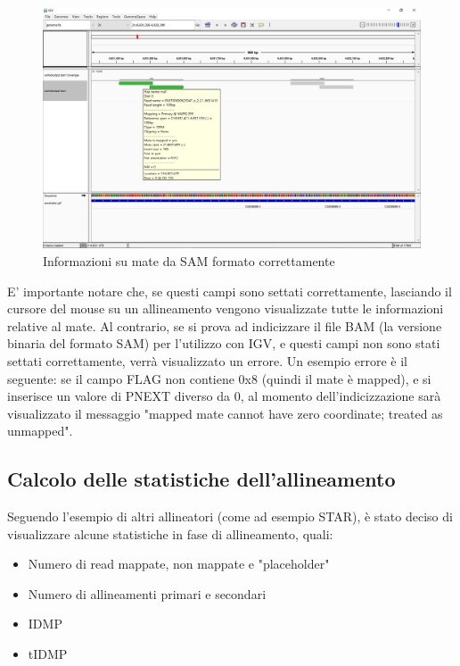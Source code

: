 \begin{figure}[h]
	\centering
	\includegraphics[width=\linewidth]{images/mateinfo.png}
  \caption{Informazioni su mate da SAM formato correttamente}
  \label{fig:Mate info}
\end{figure}

\newpage

E' importante notare che, se questi campi sono settati correttamente, lasciando il cursore del mouse su un allineamento vengono visualizzate tutte le informazioni relative al mate. Al contrario, se si prova ad indicizzare il file BAM (la versione binaria del formato SAM) per l'utilizzo con IGV, e questi campi non sono stati settati correttamente, verrà visualizzato un errore. Un esempio errore è il seguente: se il campo FLAG non contiene 0x8 (quindi il mate è mapped), e si inserisce un valore di PNEXT diverso da 0, al momento dell'indicizzazione sarà visualizzato il messaggio "mapped mate cannot have zero coordinate; treated as unmapped".

\subsection{Calcolo delle statistiche dell'allineamento}
Seguendo l'esempio di altri allineatori (come ad esempio STAR), è stato deciso di visualizzare alcune statistiche in fase di allineamento, quali:

\begin{itemize}
	\item Numero di read mappate, non mappate e "placeholder"
	\item Numero di allineamenti primari e secondari
	\item IDMP
	\item tIDMP
\end{itemize}

